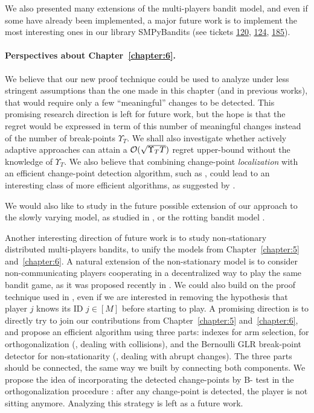 We also presented many extensions of the multi-players bandit model,
and even if some have already been implemented, a major future work is to implement the most interesting ones in our library SMPyBandits
(see tickets \href{https://github.com/SMPyBandits/SMPyBandits/issues/120}{120}, \href{https://github.com/SMPyBandits/SMPyBandits/issues/124}{124}, \href{https://github.com/SMPyBandits/SMPyBandits/issues/185}{185}).


\paragraph{Perspectives about \textbf{Chapter~\ref{chapter:6}}.}

We believe that our new proof technique could be used to analyze \GLRklUCB{} under less stringent assumptions than the one made in this chapter (and in previous works), that would require only a few ``meaningful'' changes to be detected.
This promising research direction is left for future work,  but the hope is that the regret would be expressed in term of this number of meaningful changes instead of the number of break-points $\Upsilon_T$.
We shall also investigate whether actively adaptive approaches can attain a $\mathcal{O}(\sqrt{\Upsilon_T T})$ regret upper-bound without the knowledge of $\Upsilon_T$.
We also believe that combining change-point \emph{localization} with an efficient change-point detection algorithm, such as \GLRklUCB, could lead to an interesting class of more efficient algorithms, as suggested by \cite{Maillard2018GLR}.

We would also like to study in the future possible extension of our approach to the slowly varying model, as studied in \cite{Besbes14stochastic,Louedec16,WeiSrivastava18Abruptly}, or the rotting bandit model \cite{Seznec2018}.

Another interesting direction of future work is to study non-stationary distributed multi-players bandits, to unify the models from Chapter~\ref{chapter:5} and~\ref{chapter:6}.
A natural extension of the non-stationary model is to consider non-communicating players cooperating in a decentralized way to play the same bandit game, as it was proposed recently in \cite{WeiSrivastava18Distributed}.
%
We could also build on the proof technique used in \cite{WeiSrivastava18Abruptly}, even if we are interested in removing the hypothesis that player $j$ knows its ID $j\in[M]$ before starting to play.
%
A promising direction is to directly try to join our contributions from Chapter~\ref{chapter:5} and~\ref{chapter:6}, and propose an efficient algorithm using three parts:
\klUCB{} indexes for arm selection,
\MCTopM{} for orthogonalization (\ie, dealing with collisions),
and the Bernoulli GLR break-point detector for non-stationarity (\ie, dealing with abrupt changes).
The three parts should be connected, the same way we built \GLRklUCB{} by connecting both components.
We propose the idea of incorporating the detected change-points by B-\GLR{} test in the orthogonalization procedure \MCTopM: after any change-point is detected, the player is not sitting anymore.
Analyzing this strategy is left as a future work.

